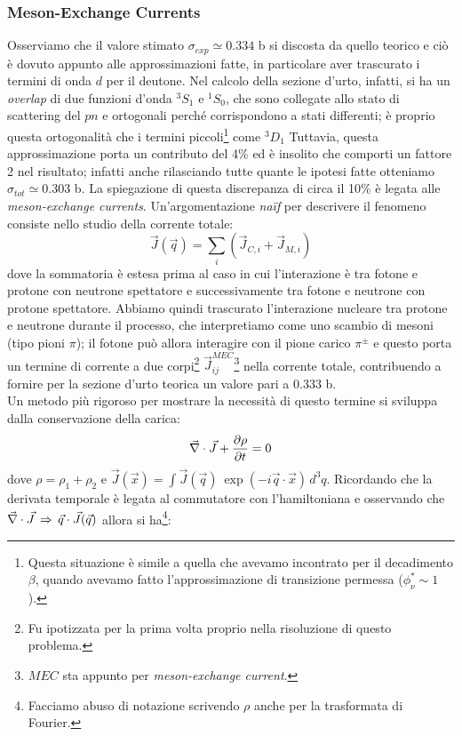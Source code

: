 \subsubsection{Meson-Exchange Currents}
Osserviamo che il valore stimato $\sigma_{exp} \simeq 0.334$ b si discosta da quello teorico e ciò è dovuto appunto alle approssimazioni fatte, in particolare aver trascurato i termini di onda $d$ per il deutone. Nel calcolo della sezione d'urto, infatti, si ha un \textit{overlap} di due funzioni d'onda ${^3S_1}$ e ${^1S_0}$, che sono collegate allo stato di scattering del $pn$ e ortogonali perché corrispondono a stati differenti; è proprio questa ortogonalità che  i termini piccoli\footnote{Questa situazione è simile a quella che avevamo incontrato per il decadimento $\beta$, quando avevamo fatto l'approssimazione di transizione permessa ($\phi_\nu^*\sim 1$).} come ${^3D_1}$
Tuttavia, questa approssimazione porta un contributo del 4\% ed è insolito che comporti un fattore 2 nel risultato; infatti anche rilasciando tutte quante le ipotesi fatte otteniamo $\sigma_{tot} \simeq 0.303$ b. La spiegazione di questa discrepanza di circa il 10\% è legata alle \textit{meson-exchange currents}. Un'argomentazione \textit{na\"if} per descrivere il fenomeno consiste nello studio della corrente totale:
$$\vec{J}(\vec{q}) = \sum_i (\vec{J}_{C,i} + \vec{J}_{M,i})$$
dove la sommatoria è estesa prima al caso in cui l'interazione è tra fotone e protone con neutrone spettatore e successivamente tra fotone e neutrone con protone spettatore. Abbiamo quindi trascurato l'interazione nucleare tra protone e neutrone durante il processo, che interpretiamo come uno scambio di mesoni (tipo pioni $\pi$); il fotone può allora interagire con il pione carico $\pi^\pm$ e questo porta un termine di corrente a due corpi\footnote{Fu ipotizzata per la prima volta proprio nella risoluzione di questo problema.} $\vec{J}_{ij}^{MEC}$\footnote{$MEC$ sta appunto per \textit{meson-exchange current}.} nella corrente totale, contribuendo a fornire per la sezione d'urto teorica un valore pari a $0.333$ b.\\
Un metodo più rigoroso per mostrare la necessità di questo termine si sviluppa dalla conservazione della carica:
$$\vec{\nabla}\cdot\vec{J}+\frac{\partial \rho}{\partial t} = 0$$
dove $\rho = \rho_1 + \rho_2$ e $\vec{J}(\vec{x}) = \int \vec{J}(\vec{q})\:\exp{(-i\vec{q}\cdot\vec{x})}\,d^3q$. Ricordando che la derivata temporale è legata al commutatore con l'hamiltoniana e osservando che $\vec{\nabla}\cdot\vec{J}\,\Rightarrow\,\vec{q}\cdot\vec{J}(\vec{q})$ allora si ha\footnote{Facciamo abuso di notazione scrivendo $\rho$ anche per la trasformata di Fourier.}:

